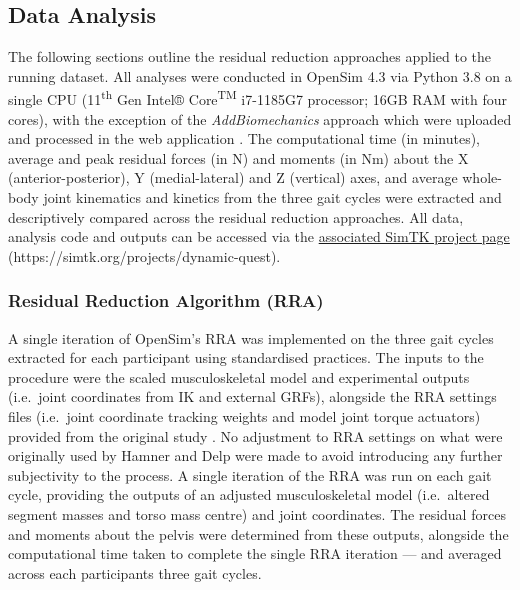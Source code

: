 \documentclass[]{elsarticle} %
\begin{document}
\hypertarget{data-analysis}{%
\subsection{Data Analysis}\label{data-analysis}}

The following sections outline the residual reduction approaches applied
to the running dataset. All analyses were conducted in OpenSim 4.3 via
Python 3.8 on a single CPU (11\textsuperscript{th} Gen Intel®
Core\textsuperscript{TM} i7-1185G7 processor; 16GB RAM with four cores),
with the exception of the \emph{AddBiomechanics} approach which were
uploaded and processed in the web application
\citep{AddBiomechanics2023}. The computational time (in minutes),
average and peak residual forces (in N) and moments (in Nm) about the X
(anterior-posterior), Y (medial-lateral) and Z (vertical) axes, and
average whole-body joint kinematics and kinetics from the three gait
cycles were extracted and descriptively compared across the residual
reduction approaches. All data, analysis code and outputs can be
accessed via the
\href{https://simtk.org/projects/dynamic-quest}{associated SimTK project
page} (https://simtk.org/projects/dynamic-quest).

\hypertarget{residual-reduction-algorithm-rra}{%
\subsubsection{Residual Reduction Algorithm
(RRA)}\label{residual-reduction-algorithm-rra}}

A single iteration of OpenSim's RRA was implemented on the three gait
cycles extracted for each participant using standardised practices. The
inputs to the procedure were the scaled musculoskeletal model and
experimental outputs (i.e.~joint coordinates from IK and external GRFs),
alongside the RRA settings files (i.e.~joint coordinate tracking weights
and model joint torque actuators) provided from the original study
\citep{Hamner2013}. No adjustment to RRA settings on what were
originally used by Hamner and Delp \citep{Hamner2013} were made to avoid
introducing any further subjectivity to the process. A single iteration
of the RRA was run on each gait cycle, providing the outputs of an
adjusted musculoskeletal model (i.e.~altered segment masses and torso
mass centre) and joint coordinates. The residual forces and moments
about the pelvis were determined from these outputs, alongside the
computational time taken to complete the single RRA iteration --- and
averaged across each participants three gait cycles.
\end{document}
